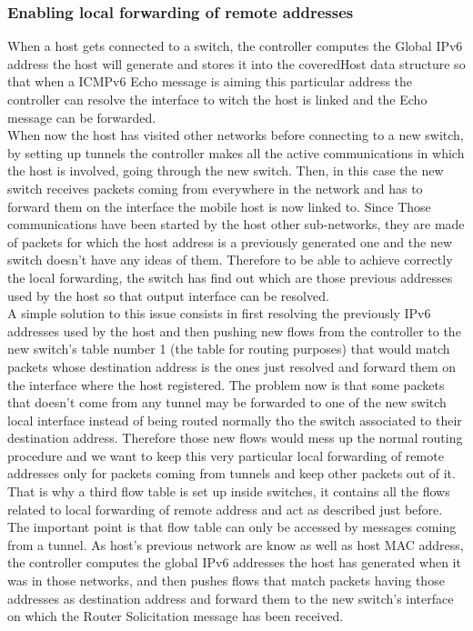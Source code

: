 \documentclass{article}
\begin{document}
\subsubsection{Enabling local forwarding of remote addresses}
When a host gets connected to a switch, the controller computes the
Global IPv6 address the host will generate and stores it into the
coveredHost data structure so that when a ICMPv6 Echo message is
aiming this particular address the controller can resolve the
interface to witch the host is linked and the Echo message can be
forwarded.\\ 
\newline
When now the host has visited other networks before connecting to a
new switch, by setting up tunnels the controller makes all the active
communications in which the host is involved, going through the new
switch. Then, in this case the new switch receives packets coming from
everywhere in the network and has to forward them on the interface the
mobile host is now linked to. Since Those communications have been
started by the host other sub-networks, they are made of packets for
which the host address is a previously generated one and the new
switch doesn't have any ideas of them. Therefore to be able to achieve
correctly the local forwarding, the switch has find out which are
those previous addresses used by the host so that output interface can
be resolved.\\
\newline
A simple solution to this issue consists in first resolving the
previously IPv6 addresses used by the host and then pushing new flows
from the controller to the new switch's table number 1 (the table for
routing purposes) that would match packets whose destination address
is the ones just resolved and forward them on the interface where the
host registered. The problem now is that some packets that doesn't
come from any tunnel may be forwarded to one of the new switch local
interface instead of being routed normally tho the switch associated to
their destination address. Therefore those new flows would mess up the
normal routing procedure and we want to keep this very particular
local forwarding of remote addresses only for packets coming from
tunnels and keep other packets out of it.\\
\newline
That is why a third flow table is set up inside switches, it contains
all the flows related to local forwarding of remote address and act as
described just before. The important point is that flow table can only
be accessed by messages coming from a tunnel. As host's previous
network are know as well as host MAC address, the controller computes
the global IPv6 addresses the host has generated when it was in those
networks, and then pushes flows that match packets having those addresses
as destination address and forward them to the new switch's interface
on which the Router Solicitation message has been received.
\end{document}
